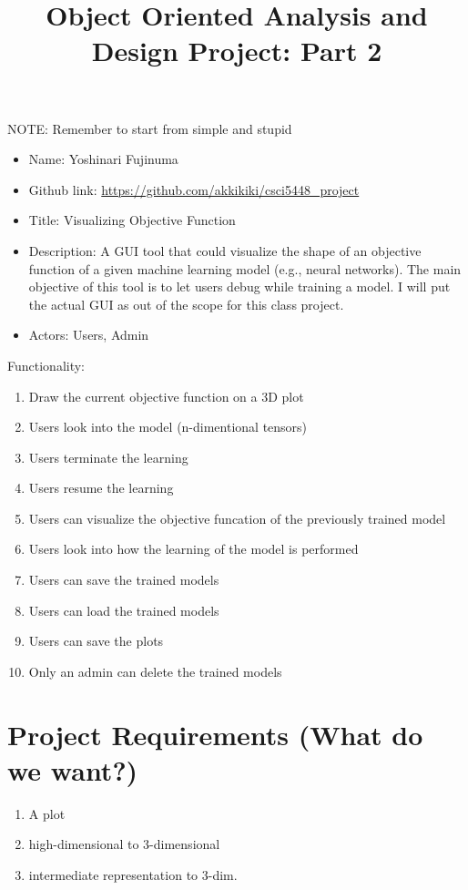 \documentclass[11pt]{article}
\begin{document}
\vspace{-1cm}
\title{\vspace{-2ex} Object Oriented Analysis and Design Project: Part 2\vspace{-2ex}}
\date{\vspace{-6ex}}
\maketitle

NOTE: Remember to start from simple and stupid

\begin{itemize}
 \item Name: Yoshinari Fujinuma
 \item Github link: \url{https://github.com/akkikiki/csci5448_project}
 \item Title: Visualizing Objective Function
 \item Description: A GUI tool that could visualize the shape of an objective function of a given machine learning model (e.g., neural networks). The main objective of this tool is to let users debug while training a model. I will put the actual GUI as out of the scope for this class project. 
 \item Actors: Users, Admin
\end{itemize}

Functionality:
\begin{enumerate}[leftmargin=4\parindent,itemsep=-1ex]
 \item Draw the current objective function on a 3D plot
 \item Users look into the model (n-dimentional tensors)
 \item Users terminate the learning
 \item Users resume the learning
 \item Users can visualize the objective funcation of the previously trained model
 \item Users look into how the learning of the model is performed
 \item Users can save the trained models
 \item Users can load the trained models
 \item Users can save the plots
 \item Only an admin can delete the trained models
\end{enumerate}

\section{Project Requirements (What do we want?)}
\begin{enumerate}[leftmargin=4\parindent,itemsep=-1ex]
 \item A plot
 \item high-dimensional to 3-dimensional
 \item intermediate representation to 3-dim.
\end{enumerate}
\end{document}
